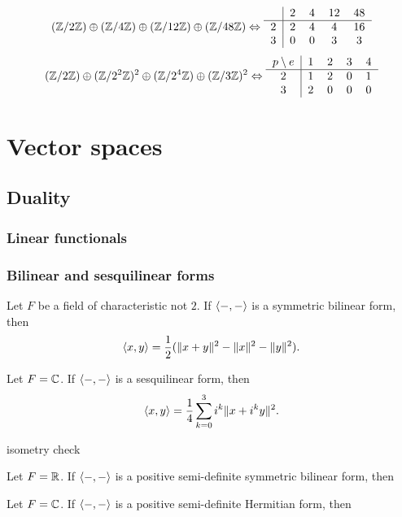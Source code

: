 \documentclass{../../large}
\begin{document}
\[
(\Z/2\Z)\oplus(\Z/4\Z)\oplus(\Z/12\Z)\oplus(\Z/48\Z)
\Leftrightarrow
\begin{tabular}{c|cccc}
& 2 & 4 & 12 & 48 \\\hline
2 & 2 & 4 & 4 & 16 \\
3 & 0 & 0 & 3 & 3
\end{tabular}
\]
\[
(\Z/2\Z)\oplus(\Z/2^2\Z)^2\oplus(\Z/2^4\Z)\oplus(\Z/3\Z)^2
\Leftrightarrow
\begin{tabular}{c|cccc}
$p\setminus e$ & 1 & 2 & 3 & 4 \\\hline
2 & 1 & 2 & 0 & 1 \\
3 & 2 & 0 & 0 & 0
\end{tabular}
\]




\part{Vector spaces}


\chapter{Duality}
\section{Linear functionals}

\begin{prb}
\end{prb}


\section{Bilinear and sesquilinear forms}

\begin{prb}
\begin{parts}
\item Let $F$ be a field of characteristic not $2$. If $\langle-,-\rangle$ is a symmetric bilinear form, then
\[\langle x,y\rangle=\frac12(\|x+y\|^2-\|x\|^2-\|y\|^2).\]
\item Let $F=\mathbb{C}$. If $\langle-,-\rangle$ is a sesquilinear form, then
\[\langle x,y\rangle=\frac14\sum_{k=0}^3i^k\|x+i^ky\|^2.\]
\item isometry check
\end{parts}
\end{prb}

\begin{prb}
\begin{parts}
\item Let $F=\mathbb{R}$. If $\langle-,-\rangle$ is a positive semi-definite symmetric bilinear form, then
\item Let $F=\mathbb{C}$. If $\langle-,-\rangle$ is a positive semi-definite Hermitian form, then
\end{parts}
\end{prb}
\end{document}
